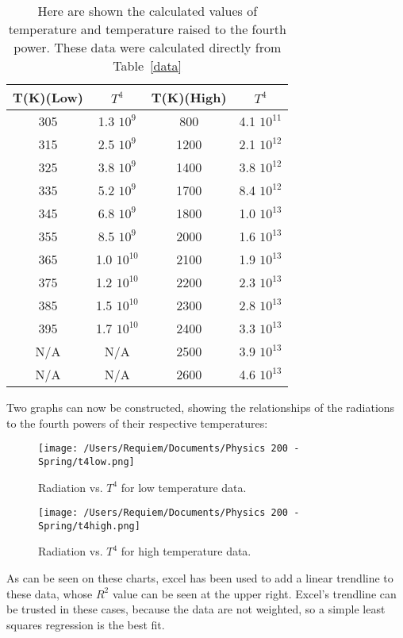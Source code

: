 \documentclass[aps,pre,twocolumn,nofootinbib]{revtex4}
\begin{document}
\begin{table}[h]
	\caption{Here are shown the calculated values of temperature and temperature raised to the fourth power.  These data were calculated directly from Table~\ref{data}}
\begin{ruledtabular}
	\begin{tabular}{cccc} 
	T(K)(Low) & $T^4$ & T(K)(High) & $T^4$\\ \hline
	305 & 1.3 $10^9$ & 800 & 4.1 $10^{11}$\\
	315 & 2.5 $10^9$ & 1200 & 2.1 $10^{12}$\\
	325 & 3.8 $10^9$ & 1400 & 3.8 $10^{12}$\\
	335 & 5.2 $10^9$ & 1700 & 8.4 $10^{12}$\\
	345 & 6.8 $10^9$ & 1800 & 1.0 $10^{13}$\\
	355 & 8.5 $10^9$ & 2000 & 1.6 $10^{13}$\\
	365 & 1.0 $10^{10}$ & 2100 & 1.9 $10^{13}$\\
	375 & 1.2 $10^{10}$ & 2200 & 2.3 $10^{13}$\\
	385 & 1.5 $10^{10}$ & 2300 & 2.8 $10^{13}$\\
	395 & 1.7 $10^{10}$ & 2400 & 3.3 $10^{13}$\\
	N/A & N/A & 2500 & 3.9 $10^{13}$\\
	N/A & N/A & 2600 & 4.6 $10^{13}$\\
	\end{tabular}
	\end{ruledtabular}
	\label{Temp}
\end{table}
Two graphs can now be constructed, showing the relationships of the radiations to the fourth powers of their respective temperatures:
\begin{figure}[h]
\centering
\texttt{[image: /Users/Requiem/Documents/Physics 200 - Spring/t4low.png]} 
\caption{Radiation vs. $T^4$ for low temperature data. }
\label{lowt}
\end{figure}
\begin{figure}[h]
\centering
\texttt{[image: /Users/Requiem/Documents/Physics 200 - Spring/t4high.png]} 
\caption{Radiation vs. $T^4$ for high temperature data. }
\label{hight}
\end{figure}
As can be seen on these charts, excel has been used to add a linear trendline to these data, whose $R^2$ value can be seen at the upper right.  Excel's trendline can be trusted in these cases, because the data are not weighted, so a simple least squares regression is the best fit.  
\end{document}
